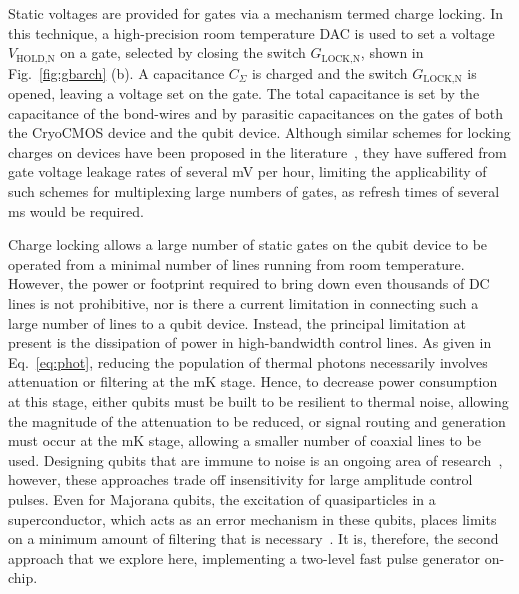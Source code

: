 Static voltages are provided for gates via a mechanism termed charge locking. In this technique, a high-precision room temperature DAC is used to set a voltage $V_\textrm{HOLD,N}$ on a
gate, selected by closing the switch $G_\textrm{LOCK,N}$, shown in Fig.~\ref{fig:gbarch} (b). A capacitance $C_\Sigma$ is charged and the switch $G_\textrm{LOCK,N}$ is opened, leaving a voltage set on the gate. The total capacitance is set by the capacitance of the bond-wires and by parasitic capacitances on the gates of both the CryoCMOS device and the qubit device. Although similar schemes for locking charges on devices have been proposed in the literature~\cite{PhysRevApplied.9.054016,doi:10.1063/1.4932012}, they have suffered from gate voltage leakage rates of several mV per hour, limiting the applicability of such schemes for multiplexing large numbers of gates, as refresh times of several ms would be required.

Charge locking allows a large number of static gates on the qubit device to be operated from a minimal number of lines running from room temperature. However, the power or footprint required to bring down even thousands of DC lines is not prohibitive, nor is there a current limitation in connecting such a large number of lines to a qubit device. Instead, the principal limitation at present is the dissipation of power in high-bandwidth control lines. As given in Eq.~\ref{eq:phot}, reducing the population of thermal photons necessarily involves attenuation or filtering at the mK stage. Hence, to decrease power consumption at this stage, either qubits must be built to be resilient to thermal noise, allowing
the magnitude of the attenuation to be reduced, or signal routing and generation must occur at the mK stage, allowing a smaller number of coaxial lines to be used. Designing qubits
that are immune to noise is an ongoing area of research~\cite{PhysRevB.93.121410,PhysRevLett.121.177701,PhysRevB.97.155402}, however, these approaches trade off insensitivity for large amplitude control pulses. Even for Majorana qubits, the excitation of quasiparticles in a superconductor, which acts as an error mechanism in these qubits, places limits on a minimum amount of filtering that is necessary~\cite{PhysRevLett.106.167004}. It is, therefore, the second approach that we explore here, implementing a two-level
fast pulse generator on-chip.

